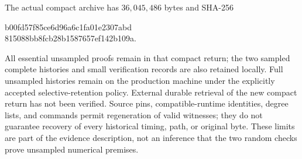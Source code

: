 The actual compact archive has $36{,}045{,}486$ bytes and SHA-256
\begin{center}\ttfamily\footnotesize
 b00fd57f85ce6d96a6c1fa01e2307abd\\
 815088bb8fcb28b1587657ef142b109a.
\end{center}
All essential unsampled proofs remain in that compact return; the two
sampled complete histories and small verification records are also
retained locally.  Full unsampled histories remain on the production
machine under the explicitly accepted selective-retention policy.
External durable retrieval of the new compact return has not been
verified.  Source pins, compatible-runtime identities, degree lists,
and commands permit regeneration of valid witnesses; they do not
guarantee recovery of every historical timing, path, or original byte.
These limits are part of the evidence description, not an inference
that the two random checks prove unsampled numerical premises.
